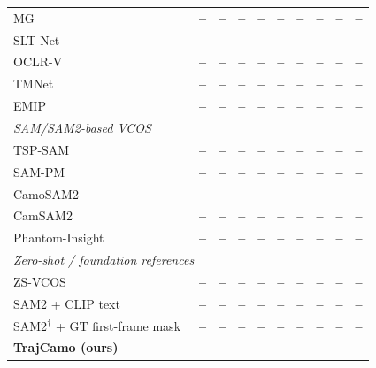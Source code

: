 \documentclass[11pt]{article}
\newcommand{\TBD}{\textcolor{red!70!black}{\textbf{--}}}
\begin{document}
\begin{table}[t]
\begin{tabular}{lccccc|cccc}
MG~\cite{yang2021}                   & \TBD & \TBD & \TBD & \TBD & \TBD & \TBD & \TBD & \TBD & \TBD \\
SLT-Net~\cite{sltnet}                & \TBD & \TBD & \TBD & \TBD & \TBD & \TBD & \TBD & \TBD & \TBD \\
OCLR-V~\cite{oclrv}                  & \TBD & \TBD & \TBD & \TBD & \TBD & \TBD & \TBD & \TBD & \TBD \\
TMNet~\cite{tmnet}                   & \TBD & \TBD & \TBD & \TBD & \TBD & \TBD & \TBD & \TBD & \TBD \\
EMIP~\cite{emip}                     & \TBD & \TBD & \TBD & \TBD & \TBD & \TBD & \TBD & \TBD & \TBD \\
\midrule
\multicolumn{10}{l}{\emph{SAM/SAM2-based VCOS}} \\
TSP-SAM~\cite{tspsam}                & \TBD & \TBD & \TBD & \TBD & \TBD & \TBD & \TBD & \TBD & \TBD \\
SAM-PM~\cite{sampm}                  & \TBD & \TBD & \TBD & \TBD & \TBD & \TBD & \TBD & \TBD & \TBD \\
CamoSAM2~\cite{camosam2}             & \TBD & \TBD & \TBD & \TBD & \TBD & \TBD & \TBD & \TBD & \TBD \\
CamSAM2~\cite{camsam2}               & \TBD & \TBD & \TBD & \TBD & \TBD & \TBD & \TBD & \TBD & \TBD \\
Phantom-Insight~\cite{phantominsight} & \TBD & \TBD & \TBD & \TBD & \TBD & \TBD & \TBD & \TBD & \TBD \\
\midrule
\multicolumn{10}{l}{\emph{Zero-shot / foundation references}} \\
ZS-VCOS~\cite{zsvcos}                & \TBD & \TBD & \TBD & \TBD & \TBD & \TBD & \TBD & \TBD & \TBD \\
SAM2 + CLIP text~\cite{sam2}         & \TBD & \TBD & \TBD & \TBD & \TBD & \TBD & \TBD & \TBD & \TBD \\
SAM2$^\dagger$ + GT first-frame mask~\cite{sam2} & \TBD & \TBD & \TBD & \TBD & \TBD & \TBD & \TBD & \TBD & \TBD \\
\midrule
\textbf{TrajCamo (ours)}             & \TBD & \TBD & \TBD & \TBD & \TBD & \TBD & \TBD & \TBD & \TBD \\
\bottomrule
\end{tabular}
\end{table}
\end{document}
